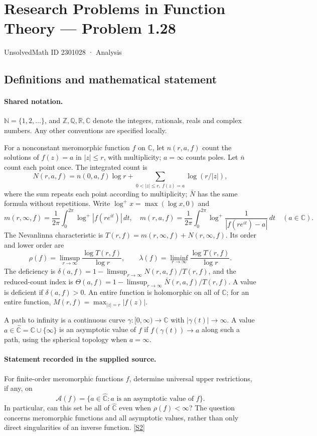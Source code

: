 \documentclass[11pt]{article}
\newcommand{\sref}[2]{\hyperlink{source:#1:#2}{[S#2]}}
\begin{document}
\setcounter{section}{2301027}
\section{Research Problems in Function Theory — Problem 1.28}\label{2301028}
{\small\sffamily UnsolvedMath ID 2301028 · Analysis}
\subsection{Definitions and mathematical statement}

\paragraph{Shared notation.}$\mathbb N=\{1,2,\ldots\}$, and $\mathbb Z,\mathbb Q,\mathbb R,\mathbb C$ denote the integers, rationals, reals and complex numbers. Any other conventions are specified locally.


For a nonconstant meromorphic function $f$ on $\mathbb C$, let $n(r,a,f)$ count the solutions of $f(z)=a$ in $|z|\le r$, with multiplicity; $a=\infty$ counts poles. Let $\bar n$ count each point once. The integrated count is
\[
 N(r,a,f)=n(0,a,f)\log r+\sum_{0<|z|\le r,\ f(z)=a}\log(r/|z|),
\]
where the sum repeats each point according to multiplicity; $\bar N$ has the same formula without repetitions. Write $\log^+x=\max(\log x,0)$ and
\[
 m(r,\infty,f)=\frac1{2\pi}\int_0^{2\pi}\log^+|f(re^{it})|\,dt,\quad
 m(r,a,f)=\frac1{2\pi}\int_0^{2\pi}\log^+\frac1{|f(re^{it})-a|}\,dt\quad(a\in\mathbb C).
\]
The Nevanlinna characteristic is $T(r,f)=m(r,\infty,f)+N(r,\infty,f)$. Its order and lower order are
\[
 \rho(f)=\limsup_{r\to\infty}\frac{\log T(r,f)}{\log r},\qquad
 \lambda(f)=\liminf_{r\to\infty}\frac{\log T(r,f)}{\log r}.
\]
The deficiency is $\delta(a,f)=1-\limsup_{r\to\infty}N(r,a,f)/T(r,f)$, and the reduced-count index is $\Theta(a,f)=1-\limsup_{r\to\infty}\bar N(r,a,f)/T(r,f)$. A value is deficient if $\delta(a,f)>0$. An entire function is holomorphic on all of $\mathbb C$; for an entire function, $M(r,f)=\max_{|z|=r}|f(z)|$.

A path to infinity is a continuous curve $\gamma:[0,\infty)\to\mathbb C$ with $|\gamma(t)|\to\infty$. A value $a\in\widehat{\mathbb C}=\mathbb C\cup\{\infty\}$ is an asymptotic value of $f$ if $f(\gamma(t))\to a$ along such a path, using the spherical topology when $a=\infty$.
\paragraph{Statement recorded in the supplied source.}
For finite-order meromorphic functions $f$, determine universal upper restrictions, if any, on
\[
 \mathcal A(f)=\{a\in\widehat{\mathbb C}:a\text{ is an asymptotic value of }f\}.
\]
In particular, can this set be all of $\widehat{\mathbb C}$ even when $\rho(f)<\infty$? The question concerns meromorphic functions and all asymptotic values, rather than only direct singularities of an inverse function. \sref{2301028}{2}
\end{document}
